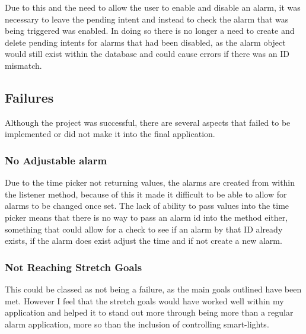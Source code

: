 Due to this and the need to allow the user to enable and disable an
alarm, it was necessary to leave the pending intent and instead to check
the alarm that was being triggered was enabled. In doing so there is no
longer a need to create and delete pending intents for alarms that had
been disabled, as the alarm object would still exist within the database
and could cause errors if there was an ID mismatch.

\subsection{Failures}\label{failures}

Although the project was successful, there are several aspects that
failed to be implemented or did not make it into the final application.

\subsubsection{No Adjustable alarm}\label{no-adjustable-alarm}

Due to the time picker not returning values, the alarms are created from
within the listener method, because of this it made it difficult to be
able to allow for alarms to be changed once set. The lack of ability to
pass values into the time picker means that there is no way to pass an
alarm id into the method either, something that could allow for a check
to see if an alarm by that ID already exists, if the alarm does exist
adjust the time and if not create a new alarm.

\subsubsection{Not Reaching Stretch
Goals}\label{not-reaching-stretch-goals}

This could be classed as not being a failure, as the main goals outlined
have been met. However I feel that the stretch goals would have worked
well within my application and helped it to stand out more through being
more than a regular alarm application, more so than the inclusion of
controlling smart-lights.
